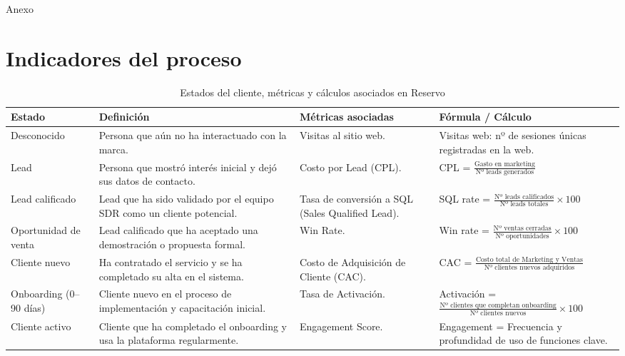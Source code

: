 \begin{appendixd}{Anexo}

  \section{Indicadores del proceso}
\begin{table}[H]
  \begin{threeparttable}
    \centering
    \scriptsize
    \caption{Estados del cliente, métricas y cálculos asociados en Reservo}
    \renewcommand{\arraystretch}{1.3}
    \begin{tabular}{|l|C{3.5cm}|C{3.3cm}|C{5.5cm}|}
      \hline
      \textbf{Estado} & \textbf{Definición} & \textbf{Métricas asociadas} & \textbf{Fórmula / Cálculo} \\
      \hline
      Desconocido & Persona que aún no ha interactuado con la marca. & Visitas al sitio web. &
      Visitas web: nº de sesiones únicas registradas en la web. \\
      \hline
      Lead & Persona que mostró interés inicial y dejó sus datos de contacto. &
      Costo por Lead (CPL). &
      CPL = $\tfrac{\text{Gasto en marketing}}{\text{Nº leads generados}}$ \\
      \hline
      Lead calificado & Lead que ha sido validado por el equipo SDR como un cliente potencial. &
      Tasa de conversión a SQL (Sales Qualified Lead). &
      SQL rate = $\tfrac{\text{Nº leads calificados}}{\text{Nº leads totales}} \times 100$ \\
      \hline
      Oportunidad de venta & Lead calificado que ha aceptado una demostración o propuesta formal. &
      Win Rate. &
      Win rate = $\tfrac{\text{Nº ventas cerradas}}{\text{Nº oportunidades}} \times 100$ \\
      \hline
      Cliente nuevo & Ha contratado el servicio y se ha completado su alta en el sistema. &
      Costo de Adquisición de Cliente (CAC). &
      CAC = $\tfrac{\text{Costo total de Marketing y Ventas}}{\text{Nº clientes nuevos adquiridos}}$ \\
      \hline
      Onboarding (0--90 días) & Cliente nuevo en el proceso de implementación y capacitación inicial. &
      Tasa de Activación. &
      Activación = $\tfrac{\text{Nº clientes que completan onboarding}}{\text{Nº clientes nuevos}} \times 100$ \\
      \hline
      Cliente activo & Cliente que ha completado el onboarding y usa la plataforma regularmente. &
      Engagement Score. &
      Engagement = Frecuencia y profundidad de uso de funciones clave. \\

\end{tabular}
\end{threeparttable}
\end{table}
\end{appendixd}
